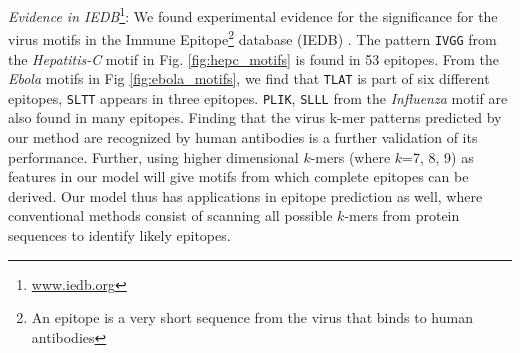 \documentclass[a4paper,11pt]{article}
\begin{document}
\noindent\emph{Evidence in IEDB}\footnote{\url{www.iedb.org}}:
We found experimental evidence for the significance for the virus motifs in the Immune Epitope\footnote{An epitope is a very short sequence from the virus that binds to human antibodies} database (IEDB) \cite{iedb}.
The pattern \texttt{IVGG} from the \textit{Hepatitis-C} motif in Fig. \ref{fig:hepc_motifs} is found in 53 epitopes.
From the \textit{Ebola} motifs in Fig \ref{fig:ebola_motifs}, we find that \texttt{TLAT} is part of six different epitopes, \texttt{SLTT} appears in three epitopes. \texttt{PLIK}, \texttt{SLLL} from the \textit{Influenza} motif are also found in many epitopes.
Finding that the virus k-mer patterns predicted by our method are recognized by human antibodies
is a further validation of its performance.
Further, using higher dimensional $k$-mers (where $k$=7, 8, 9) as
features in our model will give motifs from which complete epitopes can be derived. %
Our model thus has applications in epitope prediction as well, where conventional methods consist of scanning all possible $k$-mers from protein sequences to identify likely epitopes.
\end{document}
